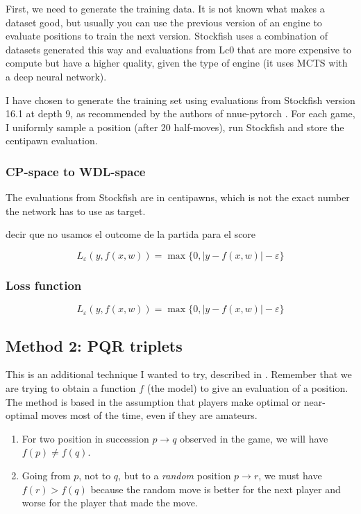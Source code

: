 First, we need to generate the training data. It is not known what makes a dataset good, but usually you can use the previous version of an engine to evaluate positions to train the next version. Stockfish uses a combination of datasets generated this way and evaluations from Lc0 that are more expensive to compute but have a higher quality, given the type of engine (it uses MCTS with a deep neural network).

I have chosen to generate the training set using evaluations from Stockfish version 16.1 at depth 9, as recommended by the authors of nnue-pytorch \cite{nnue-pytorch}. For each game, I uniformly sample a position (after 20 half-moves), run Stockfish and store the centipawn evaluation.

\setcounter{secnumdepth}{4}
\subsubsection{CP-space to WDL-space}

The evaluations from Stockfish are in centipawns, which is not the exact number the network has to use as target.


decir que no usamos el outcome de la partida para el score

\[
L_\varepsilon(y,f(x,w))=
\max\{0, |y-f(x,w)|-\varepsilon\}
\]


\subsubsection{Loss function}

\[
L_\varepsilon(y,f(x,w))=
\max\{0, |y-f(x,w)|-\varepsilon\}
\]


\subsection{Method 2: PQR triplets}

This is an additional technique I wanted to try, described in \cite{dlchess:2014}. Remember that we are trying to obtain a function $f$ (the model) to give an evaluation of a position. The method is based in the assumption that players make optimal or near-optimal moves most of the time, even if they are amateurs.

\begin{enumerate}
\item For two position in succession $p \rightarrow q$  observed in the game, we will have $f(p) \neq f(q)$.
\item Going from $p$, not to $q$, but to a \textit{random} position $p \rightarrow r$, we must have $f(r) > f(q)$ because the random move is better for the next player and worse for the player that made the move.
\end{enumerate}

